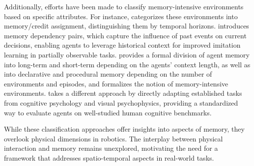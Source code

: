 Additionally, efforts have been made to classify memory-intensive environments based on specific attributes. For instance, \citet{shine_rl} categorizes these environments into memory/credit assignment, distinguishing them by temporal horizons.
\citet{yue2024learning} introduces memory dependency pairs, which capture the influence of past events on current decisions, enabling agents to leverage historical context for improved imitation learning in partially observable tasks.
\citet{memory_rl} provides a formal division of agent memory into long-term and short-term depending on the agents' context length, as well as into declarative and procedural memory depending on the number of environments and episodes, and formalizes the notion of memory-intensive environments.
\citet{psychlab} takes a different approach by directly adapting established tasks from cognitive psychology and visual psychophysics, providing a standardized way to evaluate agents on well-studied human cognitive benchmarks. 

While these classification approaches offer insights into aspects of memory, they overlook physical dimensions in robotics. The interplay between physical interaction and memory remains unexplored, motivating the need for a framework that addresses spatio-temporal aspects in real-world tasks.